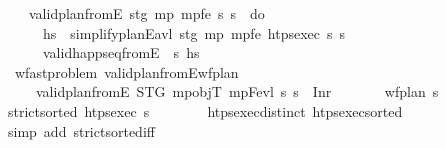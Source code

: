 \begin{isabellebody}
\ \ \ \ {\isachardoublequoteopen}valid{\isacharunderscore}{\kern0pt}plan{\isacharunderscore}{\kern0pt}from{}E\ stg\ mp\ mp{\isacharunderscore}{\kern0pt}fe\ s\ {\isasympi}s\ {\isacharequal}{\kern0pt}\ do\ {\isacharbraceleft}{\kern0pt}\isanewline
\ \ \ \ \ \ hs\ {\isasymleftarrow}\ simplify{\isacharunderscore}{\kern0pt}planE{\isacharunderscore}{\kern0pt}avl\ stg\ mp\ mp{\isacharunderscore}{\kern0pt}fe\ {\isacharparenleft}{\kern0pt}htps{\isacharunderscore}{\kern0pt}exec\ {\isasympi}s{\isacharparenright}{\kern0pt}\ {\isasympi}s{\isacharsemicolon}{\kern0pt}\ \ \isanewline
\ \ \ \ \ \ valid{\isacharunderscore}{\kern0pt}happ{\isacharunderscore}{\kern0pt}seq{\isacharunderscore}{\kern0pt}fromE\ {}\ s\ hs\isanewline
\ \ \ \ {\isacharbraceright}{\kern0pt}{\isachardoublequoteclose}\isanewline
\isanewline
\ \ \isanewline
\ \ \isanewline
\isanewline
\ \ \isamarkupfalse%
\ {\isacharparenleft}{\kern0pt}\ wf{\isacharunderscore}{\kern0pt}ast{\isacharunderscore}{\kern0pt}problem{\isacharparenright}{\kern0pt}\ valid{\isacharunderscore}{\kern0pt}plan{\isacharunderscore}{\kern0pt}fromE{\isacharunderscore}{\kern0pt}wf{\isacharunderscore}{\kern0pt}plan{\isacharcolon}{\kern0pt}\isanewline
\ \ \ \ \ {\isachardoublequoteopen}valid{\isacharunderscore}{\kern0pt}plan{\isacharunderscore}{\kern0pt}from{}E\ STG\ mp{\isacharunderscore}{\kern0pt}objT\ mp{\isacharunderscore}{\kern0pt}Fevl\ s\ {\isasympi}s\ {\isacharequal}{\kern0pt}\ Inr\ {\isacharparenleft}{\kern0pt}{\isacharparenright}{\kern0pt}{\isachardoublequoteclose}\ \isanewline
\ \ \ \ \ {\isachardoublequoteopen}wf{\isacharunderscore}{\kern0pt}plan\ {\isasympi}s{\isachardoublequoteclose}\isanewline
%
\isadelimproof
\ \ %
\endisadelimproof
%
\isatagproof
{}\isamarkupfalse%
\ {\isacharminus}{\kern0pt}\isanewline
\ \ \ \ \isamarkupfalse%
\ {\isachardoublequoteopen}strict{\isacharunderscore}{\kern0pt}sorted\ {\isacharparenleft}{\kern0pt}htps{\isacharunderscore}{\kern0pt}exec\ {\isasympi}s{\isacharparenright}{\kern0pt}{\isachardoublequoteclose}\isanewline
\ \ \ \ \ \ \isamarkupfalse%
\ htps{\isacharunderscore}{\kern0pt}exec{\isacharunderscore}{\kern0pt}distinct\ htps{\isacharunderscore}{\kern0pt}exec{\isacharunderscore}{\kern0pt}sorted\ \isamarkupfalse%
\ {\isacharparenleft}{\kern0pt}simp\ add{\isacharcolon}{\kern0pt}\ strict{\isacharunderscore}{\kern0pt}sorted{\isacharunderscore}{\kern0pt}iff{\isacharparenright}{\kern0pt}\isanewline
\ \ \ \ \isamarkupfalse%

\end{isabellebody}
